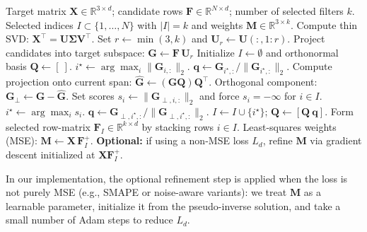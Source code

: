 \begingroup
\setlength{\textfloatsep}{6pt}
\setlength{\floatsep}{6pt}
\setlength{\intextsep}{6pt}
\begin{algorithm}[H]
\caption{PCA / Matching-Pursuit filter selection and weight estimation}
\label{alg:pca-selection}
\begin{algorithmic}[1]
\Require Target matrix $\mathbf{X}\in\mathbb{R}^{3\times d}$; candidate rows $\mathbf{F}\in\mathbb{R}^{N\times d}$; number of selected filters $k$.
\Ensure Selected indices $I\subset\{1,\dots,N\}$ with $|I|=k$ and weights $\boldsymbol{M}\in\mathbb{R}^{3\times k}$.
\State Compute thin SVD: $\mathbf{X}^\top = \mathbf{U}\boldsymbol{\Sigma}\mathbf{V}^\top$.
\State Set $r\leftarrow \min(3,k)$ and $\mathbf{U}_r \leftarrow \mathbf{U}(:,1\!:\!r)$.
\State Project candidates into target subspace: $\mathbf{G} \leftarrow \mathbf{F}\,\mathbf{U}_r$ 
\State Initialize $I\leftarrow \emptyset$ and orthonormal basis $\mathbf{Q}\leftarrow [\ ]$.
        \State $i^\star \leftarrow \arg\max_i \|\mathbf{G}_{i,:}\|_2$.
        \State $\mathbf{q} \leftarrow \mathbf{G}_{i^\star,:}/\|\mathbf{G}_{i^\star,:}\|_2$.
    \Else
        \State Compute projection onto current span: $\widehat{\mathbf{G}} \leftarrow (\mathbf{G}\mathbf{Q})\mathbf{Q}^\top$.
        \State Orthogonal component: $\mathbf{G}_\perp \leftarrow \mathbf{G} - \widehat{\mathbf{G}}$.
        \State Set scores $s_i\leftarrow \|\mathbf{G}_{\perp,i,:}\|_2$ and force $s_i=-\infty$ for $i\in I$.
        \State $i^\star \leftarrow \arg\max_i s_i$.
        \State $\mathbf{q} \leftarrow \mathbf{G}_{\perp,i^\star,:}/\|\mathbf{G}_{\perp,i^\star,:}\|_2$.
    \EndIf
    \State $I \leftarrow I\cup\{i^\star\}$; $\mathbf{Q} \leftarrow [\mathbf{Q}\ \mathbf{q}]$.
\EndFor
\State Form selected row-matrix $\mathbf{F}_I\in\mathbb{R}^{k\times d}$ by stacking rows $i\in I$.
\State Least-squares weights (MSE): $\boldsymbol{M} \leftarrow \mathbf{X}\,\mathbf{F}_I^{+}$.
\State \textbf{Optional:} if using a non-MSE loss $L_d$, refine $\boldsymbol{M}$ via gradient descent initialized at $\mathbf{X}\mathbf{F}_I^{+}$.
\end{algorithmic}
\end{algorithm}
\endgroup

In our implementation, the optional refinement step is applied when the loss is not purely MSE (e.g., SMAPE or noise-aware variants): we treat $\boldsymbol{M}$ as a learnable parameter, initialize it from the pseudo-inverse solution, and take a small number of Adam steps to reduce $L_d$.


